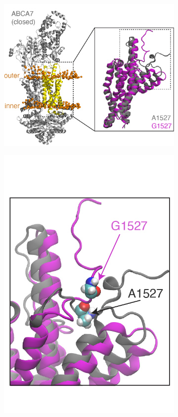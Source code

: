 \begin{figure}[ht]
\begin{subfigure}[t]{0.3\textwidth}
        \includegraphics[width=\textwidth]{./main_plots/abca7_structure_with_inset.png}        
    \end{subfigure}
    \begin{subfigure}[t]{0.165\textwidth}
        \caption{}
        \includegraphics[width=\textwidth]{./main_plots/abca7_inset_only.png}        

\end{subfigure}
\end{figure}

